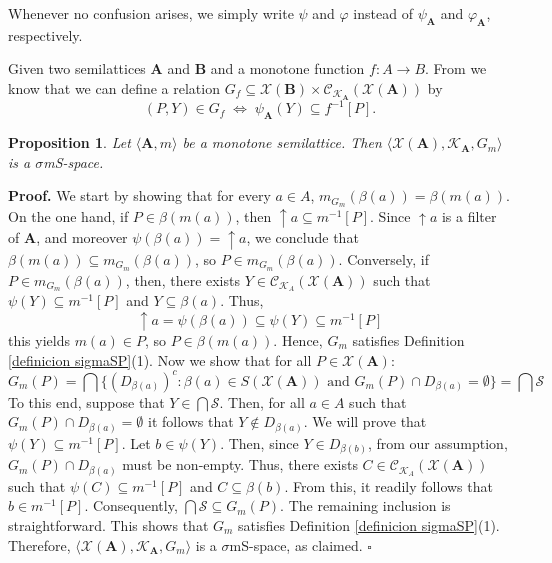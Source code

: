 \documentclass{article}
\newtheorem{proposition}{\bf Proposition}[section]
\newenvironment{proof}
{\par\noindent\textbf{Proof. }\rm}
{\hfill$\boldsymbol{\square}$\par\vspace{0.3cm}}
\begin{document}
Whenever no confusion arises, we simply write $\psi$ and $\varphi$ instead of $\psi_{\mathbf{A}}$ and $\varphi_{\mathbf{A}}$, respectively.
\medskip

Given two semilattices $\mathbf{A}$ and $\mathbf{B}$ and a monotone function $f \colon A \rightarrow B$. From \cite{P W} we know that we can define a relation $G_f \subseteq \mathcal{X}(\mathbf{B}) \times \mathcal{C}_{\mathcal{K}_\mathbf{A}}(\mathcal{X}(\mathbf{A}))$ by 
\begin{equation}\label{G_f}
(P, Y) \in G_f \;\Longleftrightarrow\; \psi_{\mathbf{A}}(Y) \subseteq f^{-1}[P].
\end{equation}

\begin{proposition}\label{G_m es sigmaSP}
Let $\langle \mathbf{A}, m \rangle$ be a monotone semilattice. Then $\langle \mathcal{X}(\mathbf{A}), \mathcal{K}_\mathbf{A}, G_m \rangle$ is a $\sigma$mS-space.
\end{proposition}
\begin{proof}
We start by showing that for every $a\in A$, $m_{G_m}(\beta(a))=\beta(m(a))$. On the one hand, if $P\in \beta(m(a))$, then $\uparrow a\subseteq m^{-1}[P]$. Since $\uparrow a$ is a filter of $\mathbf{A}$, and moreover $\psi(\beta(a))=\uparrow a$, we conclude that $\beta(m(a))\subseteq m_{G_m}(\beta(a))$, so $P\in m_{G_m}(\beta(a))$. Conversely, if $P\in m_{G_m}(\beta(a))$, then, there exists $Y\in \mathcal{C}_{\mathcal{K}_A}(\mathcal{X}(\mathbf{A}))$ such that $\psi(Y)\subseteq m^{-1}[P]$ and $Y\subseteq \beta(a)$. Thus, \[\uparrow a=\psi(\beta(a))\subseteq \psi(Y)\subseteq m^{-1}[P]\]
this yields $m(a)\in P$, so $P\in \beta(m(a))$. Hence, $G_m$ satisfies Definition \ref{definicion sigmaSP}(1). Now we show that for all $P \in \mathcal{X}(\mathbf{A})$:
\[
G_m(P) = \bigcap\{ (D_{\beta(a)})^{c} \colon \beta(a) \in S(\mathcal{X}(\mathbf{A}))\text{ and } G_m(P)\cap D_{\beta(a)}=\emptyset\}=\bigcap \mathcal{S} 
\]
To this end, suppose that $Y\in \bigcap \mathcal{S}$. Then, for all $a\in A$ such that $G_m(P)\cap D_{\beta(a)}=\emptyset$ it follows that $Y\notin D_{\beta(a)}$. We will prove that $\psi(Y)\subseteq m^{-1}[P]$. Let $b\in \psi(Y)$. Then, since $Y\in D_{\beta(b)}$, from our assumption, $G_m(P)\cap D_{\beta(a)}$ must be non-empty. Thus, there exists $C\in \mathcal{C}_{\mathcal{K}_A}(\mathcal{X}(\mathbf{A}))$ such that $\psi(C)\subseteq m^{-1}[P]$ and $C\subseteq \beta(b)$. From this, it readily follows that $b\in m^{-1}[P]$. Consequently, $\bigcap \mathcal{S}\subseteq G_m(P)$. The remaining inclusion is straightforward. This shows that  $G_m$ satisfies Definition \ref{definicion sigmaSP}(1). Therefore, $\langle \mathcal{X}(\mathbf{A}), \mathcal{K}_\mathbf{A}, G_m \rangle$ is a $\sigma$mS-space, as claimed.
\end{proof}
\end{document}
